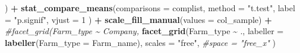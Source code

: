 \documentclass[
]{article}
\newenvironment{Shaded}{\begin{snugshade}}{\end{snugshade}}
\newcommand{\AttributeTok}[1]{\textcolor[rgb]{0.13,0.29,0.53}{#1}}
\newcommand{\CommentTok}[1]{\textcolor[rgb]{0.56,0.35,0.01}{\textit{#1}}}
\newcommand{\DecValTok}[1]{\textcolor[rgb]{0.00,0.00,0.81}{#1}}
\newcommand{\FunctionTok}[1]{\textcolor[rgb]{0.13,0.29,0.53}{\textbf{#1}}}
\newcommand{\NormalTok}[1]{#1}
\newcommand{\SpecialCharTok}[1]{\textcolor[rgb]{0.81,0.36,0.00}{\textbf{#1}}}
\newcommand{\StringTok}[1]{\textcolor[rgb]{0.31,0.60,0.02}{#1}}
\begin{document}
\begin{Shaded}
\begin{Highlighting}[]
\NormalTok{        ) }\SpecialCharTok{+}
  \FunctionTok{stat\_compare\_means}\NormalTok{(}\AttributeTok{comparisons =}\NormalTok{ complist, }
                     \AttributeTok{method =} \StringTok{"t.test"}\NormalTok{, }
                     \AttributeTok{label =} \StringTok{"p.signif"}\NormalTok{, }
                     \AttributeTok{vjust =} \DecValTok{1}
\NormalTok{                     ) }\SpecialCharTok{+}
  \FunctionTok{scale\_fill\_manual}\NormalTok{(}\AttributeTok{values =}\NormalTok{ col\_sample) }\SpecialCharTok{+}
  \CommentTok{\#facet\_grid(Farm\_type \textasciitilde{} Company,}
   \FunctionTok{facet\_grid}\NormalTok{(Farm\_type }\SpecialCharTok{\textasciitilde{}}\NormalTok{ .,}
             \AttributeTok{labeller =} \FunctionTok{labeller}\NormalTok{(}\AttributeTok{Farm\_type =}\NormalTok{ Farm\_name),}
             \AttributeTok{scales =} \StringTok{"free"}\NormalTok{,}
            \CommentTok{\#space = "free\_x"}
\NormalTok{             )}



\end{Highlighting}
\end{Shaded}
\end{document}
